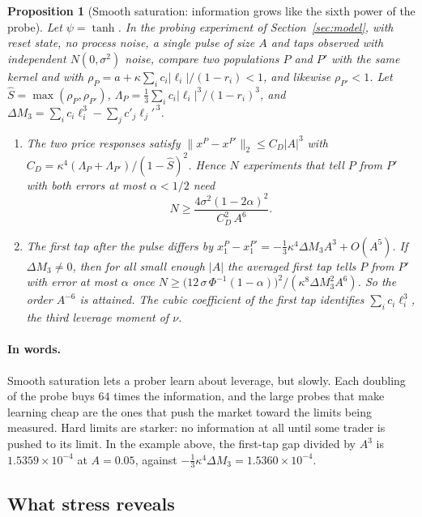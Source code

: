 \documentclass[12pt]{article}
\newtheorem{proposition}[theorem]{Proposition}
\theoremstyle{definition}
\theoremstyle{remark}
\begin{document}
\begin{proposition}[Smooth saturation: information grows like the sixth power of the probe]\label{prop:smooth}
Let $\psi=\tanh$. In the probing experiment of Section~\ref{sec:model}, with reset state, no process noise, a single pulse of size $A$ and taps observed with independent $N(0,\sigma^2)$ noise, compare two populations $P$ and $P'$ with the same kernel and with $\rho_P=a+\kappa\sum_ic_i|\ell_i|/(1-r_i)<1$, and likewise $\rho_{P'}<1$. Let $\hat S=\max(\rho_P,\rho_{P'})$, $\Lambda_P=\tfrac13\sum_ic_i|\ell_i|^3/(1-r_i)^3$, and $\Delta M_3=\sum_ic_i\ell_i^3-\sum_jc'_j\ell_j'^{\,3}$.
\begin{enumerate}[label=(\roman*),itemsep=1pt]
\item The two price responses satisfy $\|x^P-x^{P'}\|_2\le C_D|A|^3$ with $C_D=\kappa^4(\Lambda_P+\Lambda_{P'})/(1-\hat S)^2$. Hence $N$ experiments that tell $P$ from $P'$ with both errors at most $\alpha<1/2$ need
\[
 N\ge\frac{4\sigma^2(1-2\alpha)^2}{C_D^2\,A^6}.
\]
\item The first tap after the pulse differs by $x_1^P-x_1^{P'}=-\tfrac13\kappa^4\Delta M_3A^3+O(A^5)$. If $\Delta M_3\ne0$, then for all small enough $|A|$ the averaged first tap tells $P$ from $P'$ with error at most $\alpha$ once $N\ge\bigl(12\,\sigma\,\Phi^{-1}(1-\alpha)\bigr)^2/(\kappa^8\Delta M_3^2A^6)$. So the order $A^{-6}$ is attained. The cubic coefficient of the first tap identifies $\sum_ic_i\ell_i^3$, the third leverage moment of $\nu$.
\end{enumerate}
\end{proposition}


\paragraph{In words.} Smooth saturation lets a prober learn about leverage, but slowly. Each doubling of the probe buys $64$ times the information, and the large probes that make learning cheap are the ones that push the market toward the limits being measured. Hard limits are starker: no information at all until some trader is pushed to its limit. In the example above, the first-tap gap divided by $A^3$ is $1.5359\times10^{-4}$ at $A=0.05$, against $-\tfrac13\kappa^4\Delta M_3=1.5360\times10^{-4}$.


\subsection{What stress reveals}
\end{document}
